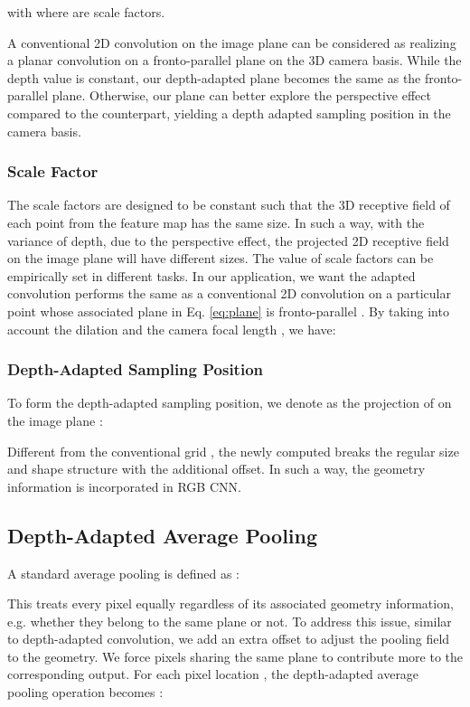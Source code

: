 \documentclass[lettersize,journal]{IEEEtran}
\begin{document}
with  where  are scale factors. 


A conventional 2D convolution on the image plane can be considered as realizing a planar convolution on a fronto-parallel plane on the 3D camera basis. While the depth value is constant, our depth-adapted plane  becomes the same as the fronto-parallel plane. Otherwise, our plane  can better explore the perspective effect compared to the counterpart, yielding a depth adapted sampling position  in the camera basis.


\subsubsection{Scale Factor}

The scale factors are designed to be constant such that the 3D receptive field of each point from the feature map has the same size. In such a way, with the variance of depth, due to the perspective effect, the projected 2D receptive field on the image plane will have different sizes. The value of scale factors can be empirically set in different tasks. In our application, we want the adapted convolution performs the same as a conventional 2D convolution on a particular point  whose associated plane in Eq. \ref{eq:plane} is fronto-parallel . By taking into account the dilation  and the camera focal length , we have: 


\subsubsection{Depth-Adapted Sampling Position}

To form the depth-adapted sampling position, we denote  as the projection of  on the image plane : 


Different from the conventional grid , the newly computed  breaks the regular size and shape structure with the additional offset. In such a way, the geometry information is incorporated in RGB CNN. 

\subsection{Depth-Adapted Average Pooling}

A standard average pooling is defined as :




This treats every pixel equally regardless of its associated geometry information, e.g. whether they belong to the same plane or not. To address this issue, similar to depth-adapted convolution, we add an extra offset to adjust the pooling field to the geometry. We force pixels sharing the same plane to contribute more to the corresponding output. For each pixel location , the depth-adapted average pooling operation becomes :
\end{document}
